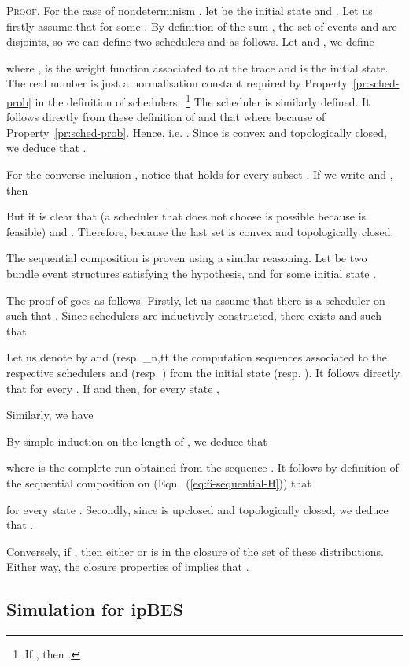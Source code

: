 \documentclass[review]{elsart}
\newenvironment{proof}{\par
\noindent
\textsc{Proof. }
\noindent}{\hfill}
\newcommand{\Eqn}[1]{Eqn.~(\ref{#1})}
\begin{document}
\begin{proof}
For the case of nondeterminism , let  be the initial state and . Let us firstly assume that  for some . By definition of the sum , the set of events  and  are disjoints, so we can define two schedulers  and  as follows. Let  and , we define

 
where ,  is the weight function associated to  at the trace  and  is the initial state. The real number  is just a normalisation constant required by Property~\ref{pr:sched-prob} in the definition of schedulers.~\footnote{If , then .} The scheduler  is similarly defined. It follows directly from these definition of  and  that  where  because of Property~\ref{pr:sched-prob}. Hence,  i.e. . Since  is convex and topologically closed, we deduce that . 

For the converse inclusion , notice that  holds for every subset . If we write  and , then 

But it is clear that  (a scheduler that does not choose  is possible because  is feasible) and . Therefore,  because the last set is convex and topologically closed.


The sequential composition is proven using a similar reasoning. Let  be two bundle event structures satisfying the hypothesis, and  for some initial state . 

The proof of  goes as follows. Firstly, let us assume that there is a scheduler  on  such that . Since schedulers are inductively constructed, there exists  and  such that 

Let us denote by  and  (resp. \varphi_{n,t}t the computation sequences associated to the respective schedulers  and  (resp. ) from the initial state  (resp. ). It follows directly that  for every . If  and  then, for every state ,

Similarly, we have


By simple induction on the length of , we deduce that

where  is the complete run obtained from the sequence . 
It follows by definition of the sequential composition on  (\Eqn{eq:6-sequential-H}) that

for every state . Secondly, since  is upclosed and topologically closed, we deduce that . 

Conversely, if , then either  or  is in the closure of the set of these distributions. Either way, the closure properties of  implies that . 
\end{proof}


\subsection{Simulation for ipBES}\label{s1511}
\end{document}
